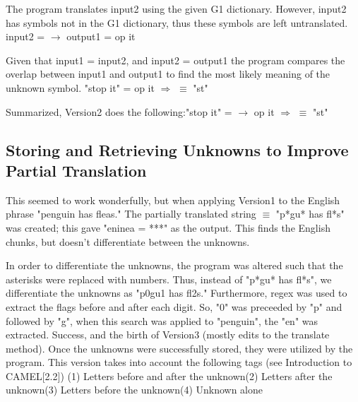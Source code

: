 \documentclass[26pt]{article}
\newcommand{\n}{\newline}
\begin{document}
The program translates input2 using the given G1 dictionary. However, input2 has symbols not in the G1 dictionary, thus these symbols are left untranslated.  input2 =  $\rightarrow$ output1 =  op it 

Given that input1 = input2, and input2 = output1 the program compares the overlap between input1 and output1 to find the most likely meaning of the unknown symbol.
"stop it" =  op it $\Rightarrow$  $\equiv$ "st"

Summarized, Version2 does the following:\n "stop it" =  $\rightarrow$  op it $\Rightarrow$  $\equiv$ "st" 
\newline\newline 



\subsection{Storing and Retrieving Unknowns to Improve Partial Translation}

This seemed to work wonderfully, but when applying Version1 to the English phrase "penguin has fleas." The partially translated string $\equiv$ "p*gu* has fl*s" was created; this gave "eninea = ***" as the output. This finds the English chunks, but doesn't differentiate between the unknowns.

In order to differentiate the unknowns, the program was altered such that the asterisks were replaced with numbers. Thus, instead of "p*gu* has fl*s", we differentiate the unknowns as "p0gu1 has fl2s."  Furthermore, regex was used to extract the flags before and after each digit. So, "0" was preceeded by "p" and followed by "g", when this search was applied to "penguin", the "en" was extracted. Success, and the birth of Version3 (mostly edits to the translate method). 
Once the unknowns were successfully stored, they were utilized by the program. \newline\newline This version takes into account the following tags (see Introduction to CAMEL[2.2]) \newline (1) Letters before and after the unknown\newline(2) Letters after the unknown\newline(3) Letters before the unknown\newline(4) Unknown alone
\newline\newline 
\end{document}
